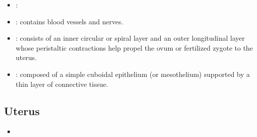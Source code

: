 \begin{multicols}{2}
\begin{itemize}
  \begin{center}
  \end{center}
  
  \item \jjj{}:
  
  \begin{center}
  \end{center}
  
  
  
  \item {}: contains blood vessels and nerves.
  
  \begin{center}
  \end{center}
  
  \item {}: consists of an inner circular or spiral layer and an outer longitudinal layer whose peristaltic contractions help propel the ovum or fertilized zygote to the uterus.
  
  \begin{center}
  \end{center}
  
  \item {}: composed of a simple cuboidal epithelium (or mesothelium) supported by a thin layer of connective tissue.
  
  \begin{center}
  \end{center}
  
\end{itemize}
\end{multicols}

\subsection{Uterus}
\begin{center}
\end{center}
\begin{multicols}{2}
\begin{itemize}
  \item 
\end{itemize}
\end{multicols}

